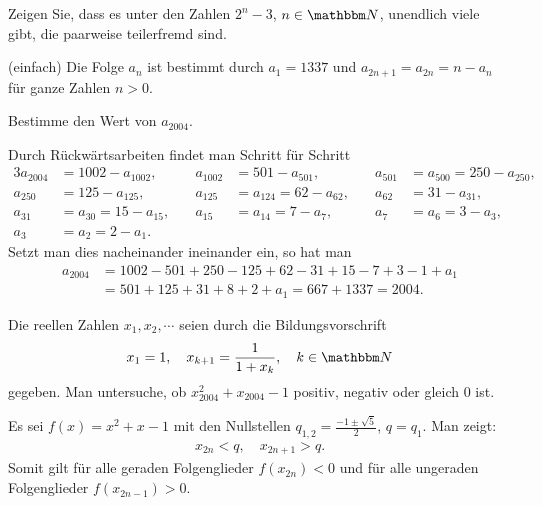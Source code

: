 \documentclass[11pt,a4paper]{article}
\begin{document}
\begin{aufgabe}
Zeigen Sie, dass es unter den Zahlen $2^n-3$, $n\in \N $, unendlich viele gibt,
die paarweise teilerfremd sind.
\end{aufgabe}


\begin{aufgabe} (einfach)
Die Folge $a_n$ ist bestimmt durch $a_1=1337$ und $a_{2n+1}=a_{2n}=n-a_n$ für
ganze Zahlen $n>0$.

Bestimme den Wert von $a_{2004}$.
\end{aufgabe}

\begin{loesung}
Durch Rückwärtsarbeiten findet man Schritt für Schritt
\begin{alignat*}{3}
a_{2004}&= 1002 -a_{1002},&\quad a_{1002}&=501 -a_{501},&\quad
a_{501}&=a_{500}=250 -a_{250},\\ 
a_{250}&= 125 -a_{125},&\quad a_{125}&=a_{124}=62 -a_{62},&\quad a_{62}&= 31
-a_{31},\\
a_{31}&=a_{30}=15 -a_{15},&\quad a_{15}&=a_{14} = 7- a_7,& \quad
a_7&=a_6=3-a_3,\\ 
a_3&=a_2=2-a_1.
\end{alignat*}
Setzt man dies nacheinander ineinander ein, so hat man
\begin{align*}
a_{2004}&= 1002-501 + 250 -125 +62 -31 +15 -7 +3 -1+ a_1\\
&= 501 +125 +31 +8 +2 +a_1= 667 +1337 =2004.
\end{align*}
\end{loesung}

\begin{aufgabe} 
Die reellen Zahlen $x_1,x_2,\cdots $ seien durch die Bildungsvorschrift
\begin{gather*}
x_1=1,\quad x_{k+1} = \frac{1}{1+x_k}, \quad k\in\N
\end{gather*}
gegeben. Man untersuche, ob  $x_{2004}^2 +x_{2004} -1 $ positiv, negativ oder
gleich $0$ ist.
\end{aufgabe}

\begin{loesung} 
Es sei $f(x)=x^2 +x -1$ mit den Nullstellen $q_{1,2}=\frac{-1\pm \sqrt{5}}{2}$,
$q=q_1$. Man zeigt:
\begin{gather*}
x_{2n} < q,\quad x_{2n+1} > q.
\end{gather*}
Somit gilt für alle geraden Folgenglieder $f(x_{2n}) < 0 $ und für alle
ungeraden Folgenglieder $f(x_{2n-1}) >0$.
\end{loesung}
\end{document}
